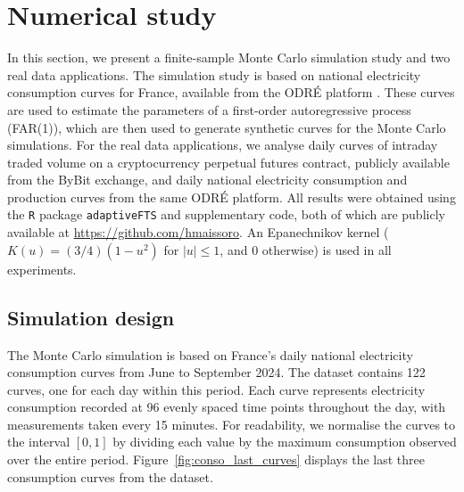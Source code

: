 \section{Numerical study}\label{sec:blup:numerical_study}

\color{magenta}
In this section, we present a finite-sample Monte Carlo simulation study and two real data applications. The simulation study is based on national electricity consumption curves for France, available from the ODR\'E platform \citep{odre_data}. These curves are used to estimate the parameters of a first-order autoregressive process (FAR(1)), which are then used to generate synthetic curves for the Monte Carlo simulations. For the real data applications, we analyse daily curves of intraday traded volume on a cryptocurrency perpetual futures contract, publicly available from the ByBit exchange, and daily national electricity consumption and production curves from the same ODR\'E platform. All results were obtained using the \texttt{R} package \texttt{adaptiveFTS} and supplementary code, both of which are publicly available at \url{https://github.com/hmaissoro}. An Epanechnikov kernel ($K(u) = (3/4)(1 - u^2)$ for $|u| \leq 1$, and $0$ otherwise) is used in all experiments.
\color{black}

\subsection{\color{magenta}Simulation design\color{black}}\label{blup:sec:simu_exp}
The Monte Carlo simulation is based on France's daily national electricity consumption curves from June to September 2024. The dataset contains 122 curves, one for each day within this period. Each curve represents electricity consumption recorded at 96 evenly spaced time points throughout the day, with measurements taken every 15 minutes. For readability, we normalise the curves to the interval $[0,1]$ by dividing each value by the maximum consumption observed over the entire period. Figure~\ref{fig:conso_last_curves} displays the last \color{magenta}three\color{black} consumption curves from the dataset.

